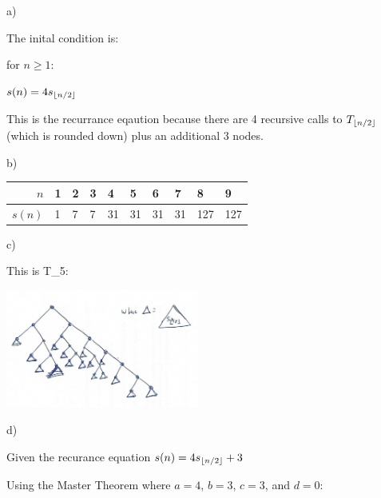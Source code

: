 \documentclass{article}
\begin{document}
\begin{solution}

\newline
a)
\newline

The inital condition is:
\newline

for $n \ge 1$:
\newline

$s(n) = 4s_{{\left\lfloor n/2\right\rfloor}}$
\newline

This is the recurrance eqaution because there are 4 recursive calls to $T_{{\left\lfloor n/2\right\rfloor}}$ (which is rounded down) plus an additional 3 nodes.
\newline





b)
\newline

\begin{tabular}{|r|p{0.15in}|p{0.15in}|p{0.15in}|p{0.15in}|p{0.15in}|p{0.15in}|p{0.15in}|p{0.15in}|p{0.15in}|} \hline
$n$     & 1 & 2 & 3 & 4 & 5 & 6 & 7 & 8 & 9  
\\ \hline
$s(n)$    & 1 & 7 & 7 & 31 & 31 & 31 & 31 & 127 & 127 
\\ \hline
\end{tabular}
\newline

\newline
c)
\newline

This is T_5:
\begin{center}
\includegraphics[width=2.5in]{tree.jpg}
\end{center}
\newline

d)
\newline

Given the recurance equation $s(n) = 4s_{{\left\lfloor n/2\right\rfloor}} +3$
\newline

Using the Master Theorem where $a=4$, $b=3$, $c=3$, and $d=0$:
\newline


\end{solution}
\end{document}
